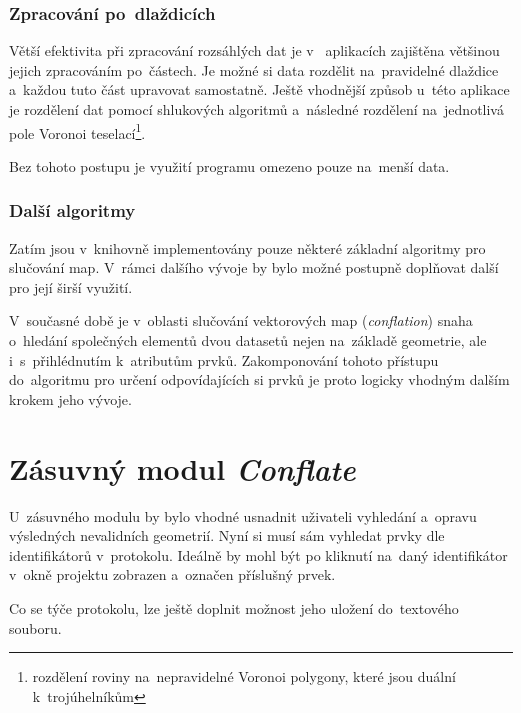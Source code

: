 








\subsubsection{Zpracování po~dlaždicích}
\label{dlazdice-vyvoj}

Větší efektivita při zpracování rozsáhlých dat je v~ 
aplikacích zajištěna většinou jejich zpracováním po~částech. Je možné
si data rozdělit na~pravidelné dlaždice a~každou tuto část upravovat
samostatně. Ještě vhodnější způsob u~této aplikace je %
rozdělení dat pomocí shlukových algoritmů a~následné rozdělení
na~jednotlivá pole Voronoi teselací\footnote{rozdělení roviny 
na~nepravidelné Voronoi polygony, které jsou duální k~trojúhelníkům
}.

Bez tohoto postupu je využití programu omezeno pouze na~menší data.


\subsubsection{Další algoritmy}
\label{dalsi-vyvoj}

Zatím jsou v~knihovně  implementovány pouze některé
základní algoritmy pro slučování map. V~rámci dalšího vývoje by
bylo možné postupně doplňovat další pro její širší využití.

V~současné době je v~oblasti slučování vektorových map 
(\textit{conflation}) snaha o~hledání společných elementů 
dvou datasetů nejen na~základě geometrie, ale i~s~přihlédnutím
k~atributům prvků. Zakomponování tohoto přístupu do~algoritmu 
pro určení odpovídajících si prvků je proto logicky vhodným 
dalším krokem jeho vývoje.


\section{Zásuvný modul \textit{Conflate}}

U~zásuvného modulu by bylo vhodné usnadnit uživateli vyhledání
a~opravu výsledných nevalidních geometrií. Nyní si musí sám
vyhledat prvky dle identifikátorů v~protokolu. Ideálně by
mohl být po kliknutí na~daný identifikátor v~okně projektu zobrazen
a~označen příslušný prvek.

Co se týče protokolu, lze ještě doplnit možnost jeho uložení
do~textového souboru.
